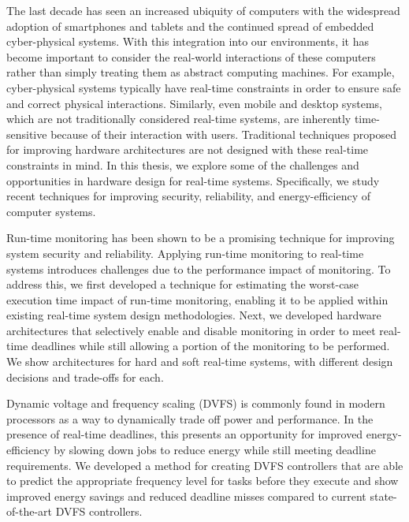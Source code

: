 The last decade has seen an increased ubiquity of computers with the widespread
adoption of smartphones and tablets and the continued spread of embedded
cyber-physical systems. With this integration into our environments, it has
become important to consider the real-world interactions of these computers
rather than simply treating them as abstract computing machines. For example,
cyber-physical systems typically have real-time constraints in order to ensure
safe and correct physical interactions. Similarly, even mobile and desktop
systems, which are not traditionally considered real-time systems, are
inherently time-sensitive because of their interaction with users.  Traditional
techniques proposed for improving hardware architectures are not designed with
these real-time constraints in mind. In this thesis, we explore some of the
challenges and opportunities in hardware design for real-time systems.
Specifically, we study recent techniques for improving security, reliability,
and energy-efficiency of computer systems. 

Run-time monitoring has been shown to be a promising technique for improving
system security and reliability. Applying run-time monitoring to real-time
systems introduces challenges due to the performance impact of monitoring.
To address this, we first developed a technique for estimating the worst-case
execution time impact of run-time monitoring, enabling it to be applied within
existing real-time system design methodologies. Next, we developed hardware
architectures that selectively enable and disable monitoring in order to meet
real-time deadlines while still allowing a portion of the monitoring to be
performed. We show architectures for hard and soft real-time systems, with
different design decisions and trade-offs for each.

Dynamic voltage and frequency scaling (DVFS) is commonly found in modern
processors as a way to dynamically trade off power and performance.
In the presence of real-time deadlines, this presents an opportunity
for improved energy-efficiency by slowing down jobs to reduce energy while
still meeting deadline requirements. We developed a method for creating DVFS
controllers that are able to predict the appropriate frequency level for tasks
before they execute and show improved energy savings and reduced deadline
misses compared to current state-of-the-art DVFS controllers.

